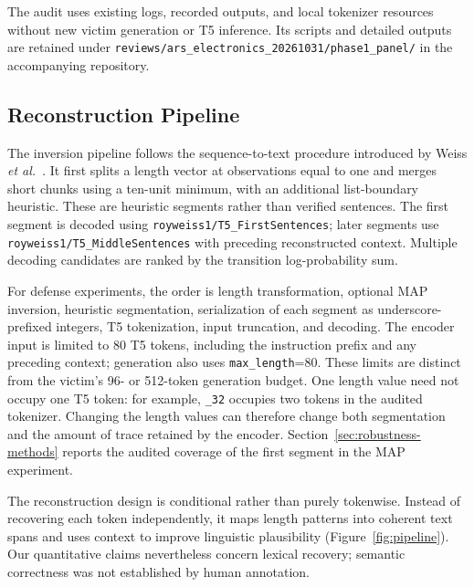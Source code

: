 \documentclass[electronics,article,submit,pdftex,moreauthors]{Definitions/mdpi}
\begin{document}
The audit uses existing logs, recorded outputs, and local tokenizer resources without new victim generation or T5 inference. Its scripts and detailed outputs are retained under \texttt{reviews/ars\_electronics\_20261031/phase1\_panel/} in the accompanying repository.

\subsection{Reconstruction Pipeline}
The inversion pipeline follows the sequence-to-text procedure introduced by Weiss \emph{et al.}~\cite{weiss2024prompt}. It first splits a length vector at observations equal to one and merges short chunks using a ten-unit minimum, with an additional list-boundary heuristic. These are heuristic segments rather than verified sentences. The first segment is decoded using \texttt{royweiss1/T5\_FirstSentences}; later segments use \texttt{royweiss1/T5\_MiddleSentences} with preceding reconstructed context. Multiple decoding candidates are ranked by the transition log-probability sum.

For defense experiments, the order is length transformation, optional MAP inversion, heuristic segmentation, serialization of each segment as underscore-prefixed integers, T5 tokenization, input truncation, and decoding. The encoder input is limited to 80 T5 tokens, including the instruction prefix and any preceding context; generation also uses \texttt{max\_length}=80. These limits are distinct from the victim's 96- or 512-token generation budget. One length value need not occupy one T5 token: for example, \texttt{\_32} occupies two tokens in the audited tokenizer. Changing the length values can therefore change both segmentation and the amount of trace retained by the encoder. Section~\ref{sec:robustness-methods} reports the audited coverage of the first segment in the MAP experiment.

The reconstruction design is conditional rather than purely tokenwise. Instead of recovering each token independently, it maps length patterns into coherent text spans and uses context to improve linguistic plausibility (Figure~\ref{fig:pipeline}). Our quantitative claims nevertheless concern lexical recovery; semantic correctness was not established by human annotation.
\end{document}
